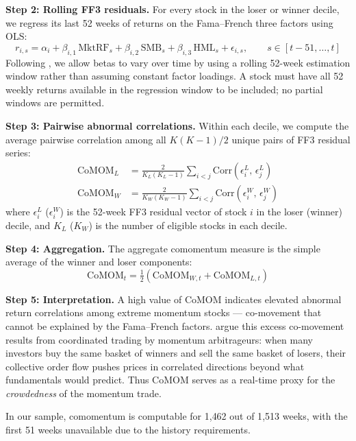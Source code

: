 \documentclass[10pt]{article}
\begin{document}
\textbf{Step 2: Rolling FF3 residuals.} For every stock in the loser or winner decile, we regress its last 52 weeks of returns on the Fama--French three factors \citep{FamaFrench1992} using OLS:
\begin{equation}
    r_{i,s} = \alpha_i + \beta_{i,1} \, \text{MktRF}_s + \beta_{i,2} \, \text{SMB}_s + \beta_{i,3} \, \text{HML}_s + \epsilon_{i,s}, \qquad s \in [t-51, \ldots, t]
\end{equation}
Following \citet{LewellenNagel2006}, we allow betas to vary over time by using a rolling 52-week estimation window rather than assuming constant factor loadings. A stock must have all 52 weekly returns available in the regression window to be included; no partial windows are permitted.

\textbf{Step 3: Pairwise abnormal correlations.} Within each decile, we compute the average pairwise correlation among all $K(K-1)/2$ unique pairs of FF3 residual series:
\begin{align}
    \text{CoMOM}_L &= \frac{2}{K_L(K_L - 1)} \sum_{i<j} \text{Corr}(\epsilon^L_i, \, \epsilon^L_j) \\[6pt]
    \text{CoMOM}_W &= \frac{2}{K_W(K_W - 1)} \sum_{i<j} \text{Corr}(\epsilon^W_i, \, \epsilon^W_j)
\end{align}
where $\epsilon^L_i$ ($\epsilon^W_i$) is the 52-week FF3 residual vector of stock $i$ in the loser (winner) decile, and $K_L$ ($K_W$) is the number of eligible stocks in each decile.

\textbf{Step 4: Aggregation.} The aggregate comomentum measure is the simple average of the winner and loser components:
\begin{equation}
    \text{CoMOM}_t = \tfrac{1}{2} \left(\text{CoMOM}_{W,t} + \text{CoMOM}_{L,t}\right)
\end{equation}

\textbf{Step 5: Interpretation.} A high value of CoMOM indicates elevated abnormal return correlations among extreme momentum stocks --- co-movement that cannot be explained by the Fama--French factors. \citet{LouPolk2021} argue this excess co-movement results from coordinated trading by momentum arbitrageurs: when many investors buy the same basket of winners and sell the same basket of losers, their collective order flow pushes prices in correlated directions beyond what fundamentals would predict. Thus CoMOM serves as a real-time proxy for the \emph{crowdedness} of the momentum trade.

In our sample, comomentum is computable for 1{,}462 out of 1{,}513 weeks, with the first 51 weeks unavailable due to the history requirements.
\end{document}
